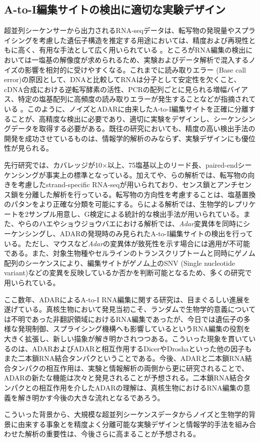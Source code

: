 \subsection{A-to-I編集サイトの検出に適切な実験デザイン}
超並列シーケンサーから出力されるRNA-seqデータは、転写物の発現量やスプライシングを考慮した遺伝子構造を推定する用途においては、精度および再現性ともに高く、有用な手法として広く用いられている \citep{MarMasMan0809, MorWilMcC0807}。ところがRNA編集の検出においては一塩基の解像度が求められるため、実験およびデータ解析で混入するノイズの影響を相対的に受けやすくなる。これまでに読み取りエラー (Base call error)の原因として、DNAと比較してRNAは分子として安定性を欠くこと、cDNA合成における逆転写酵素の活性、PCRの配列ごとに見られる増幅バイアス、特定の塩基配列に高頻度の読み取りエラーが発生することなどが指摘されている \citep{NakOshMor1107, AirRosChe11, pmid22099972}。このように、ノイズとADARに由来したA-to-I編集サイトを正確に分離することが、高精度な検出に必要であり、適切に実験をデザインし、シーケンシングデータを取得する必要がある。既往の研究においても、精度の高い検出手法の開発を成功させているものは、情報学的解析のみならず、実験デザインにも優位性が見られる。
\par
先行研究では、カバレッジが10$\times$以上、75塩基以上のリード長、paired-endシーケンシングが事実上の標準となっている。加えて\cite{Ramaswami:2012aa}や\cite{Peng:2012aa}、\cite{Zhu:2013aa}らの解析では、転写物の向きを考慮したstrand-specific RNA-seqが用いられており、センス鎖とアンチセンス鎖を分離した解析を行っている。転写物の方向性を考慮することは、塩基置換のパタンをより正確な分類を可能にする。\cite{Rodriguez:2012aa}らによる解析では、生物学的レプリケートを2サンプル用意し、G検定による統計的な検出手法が用いられている。また、\cite{BahLeeLi1201}や\cite{Rodriguez:2012aa}らのハエやショウジョウバエにおける解析では、\textit{Adar}変異体を同時にシーケンシングし、ADARの発現時のみ見られたA-to-I編集サイトの検出を行っている。ただし、マウスなど\textit{Adar}の変異体が致死性を示す場合には適用が不可能である。また、対象生物種やセルラインのトランスクリプトームと同時にゲノム配列のシーケンスにより、編集サイトがゲノム上のSNV (Single nucleotide variant)などの変異を反映しているか否かを判断可能となるため、多くの研究で用いられている。
\par
ここ数年、ADARによるA-to-I RNA編集に関する研究は、目まぐるしい進展を遂げている。真核生物において発見当初こそ、ランダムで生物学的意義については不明であった非翻訳領域におけるRNA編集であったが、今日では遺伝子の多様な発現制御、スプライシング機構へも影響しているというRNA編集の役割を大きく拡張し、新しい描象が解き明かされつつある。こういった現象を貫いているのは、ADARおよびADARと相互作用するDicerやDroshaといった他の因子もまた二本鎖RNA結合タンパクということである。今後、ADARと二本鎖RNA結合タンパクの相互作用は、実験と情報解析の両側から更に研究されることで、ADARの新たな機能は次々と発見されることが予想される。二本鎖RNA結合タンパクとの相互作用を介したADARの理解は、真核生物におけるRNA編集の意義を解き明かす今後の大きな流れとなるであろう。
\par
こういった背景から、大規模な超並列シーケンスデータからノイズと生物学的背景に由来する事象とを精度よく分離可能な実験デザインと情報学的手法を組み合わせた解析の重要性は、今後さらに高まることが予想される。
